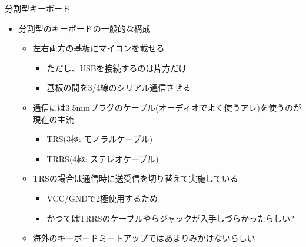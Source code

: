 \documentclass[cjk,dvipdfmx,10pt,compress,fragile%
hyperref={bookmarks=true,bookmarksnumbered=true,bookmarksopen=false,%
colorlinks=false,%
pdftitle={第 134 回 関西 Debian 勉強会},%
pdfauthor={小林},%
pdfsubject={資料},%
}]{beamer}
\begin{document}
\begin{frame}[fragile,t]{分割型キーボード}
 \begin{itemize}
  \item 分割型のキーボードの一般的な構成
	\begin{itemize}
	 \item 左右両方の基板にマイコンを載せる
	       \begin{itemize}
		\item ただし、USBを接続するのは片方だけ
		\item 基板の間を3/4線のシリアル通信させる
	       \end{itemize}
	 \item 通信には3.5mmプラグのケーブル(オーディオでよく使うアレ)を使うのが現在の主流
	       \begin{itemize}
		\item TRS(3極: モノラルケーブル)
		\item TRRS(4極: ステレオケーブル)
	       \end{itemize}
	 \item TRSの場合は通信時に送受信を切り替えて実施している
	       \begin{itemize}
		\item VCC/GNDで2極使用するため
		\item かつてはTRRSのケーブルやらジャックが入手しづらかったらしい?
	       \end{itemize}
	 \item 海外のキーボードミートアップではあまりみかけないらしい
	\end{itemize}
 \end{itemize}
\end{frame}
\end{document}

